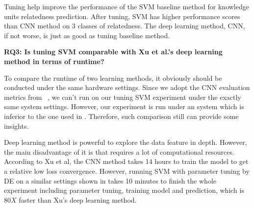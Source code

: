  
 \begin{lesson}
 Tuning help improve the performance of the  SVM baseline method for knowledge units relatedness prediction.
 After tuning, SVM has higher performance scores than CNN method on 3 classes of relatedness.
 The deep learning method, CNN, if not worse, is just as good as tuning baseline method.
 \end{lesson}
 

\textbf{ RQ3: Is tuning SVM comparable with Xu et al.'s deep learning method in terms of runtime?}
 
 To compare the runtime of two learning methods, it obviously should be conducted under the
 same hardware settings. Since we adopt the CNN evaluation metrics from ~\cite{xu2016predicting},
 we can't run on our tuning SVM experiment under the exactly same system settings. However, our experiment
 is run under an system which is inferior to the one used in \cite{xu2016predicting}. Therefore, such comparison
 still can provide some insights. 
 
 
 \begin{table}[!htp]
\centering
\caption{Comparison of Runtime and System   }
\label{tab:runtime}
\end{table}
 
Deep learning method is  powerful to explore the data feature in depth.
However, the main disadvantage of it is that requires a lot of computational resources.
 According to Xu et al, the CNN method takes 14 hours to train the model
to get a relative low loss convergence. However, running  SVM with parameter tuning
by DE on a similar settings shown in  takes 10 minutes to finish 
the whole experiment including parameter tuning, training model and prediction,
which is $80X$ faster than  Xu's deep learning method.

 
 
 
 





